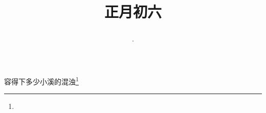 \title{\date[d=15,m=2,y=2024][year:cn-y,年,month:cn,day:cn,日,·,weekday]·正月初六 }
容得下多少小溪的混浊\footnote{ }

